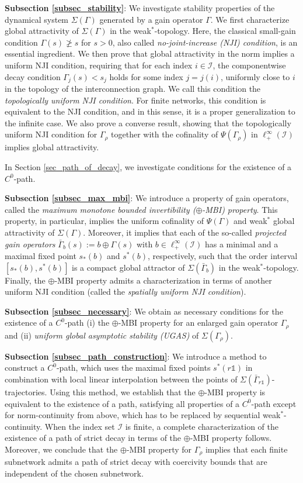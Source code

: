 \documentclass[10pt, oneside, a4paper]{article}
\newcommand{\unit}{\mathds{1}}
\newcommand{\IC}{\mathcal{I}}
\newcommand{\bsign}[1]{\bar{#1}}
\begin{document}
{\bf Subsection \ref{subsec_stability}}: We investigate stability properties of the dynamical system $\Sigma(\Gamma)$ generated by a gain operator $\Gamma$. We first characterize global attractivity of $\Sigma(\Gamma)$ in the weak$^*$-topology. Here, the classical small-gain condition $\Gamma(s) \not\geq s$ for $s > 0$, also called \emph{no-joint-increase (NJI) condition}, is an essential ingredient. We then prove that global attractivity in the norm implies a uniform NJI condition, requiring that for each index $i \in \IC$, the componentwise decay condition $\Gamma_j(s) < s_j$ holds for some index $j = j(i)$, uniformly close to $i$ in the topology of the interconnection graph. We call this condition the \emph{topologically uniform NJI condition}. For finite networks, this condition is equivalent to the NJI condition, and in this sense, it is a proper generalization to the infinite case. We also prove a converse result, showing that the topologically uniform NJI condition for $\Gamma_{\rho}$ together with the cofinality of $\Psi(\Gamma_{\rho})$ in $\ell^{\infty}_+(\IC)$ implies global attractivity.%

In Section \ref{sec_path_of_decay}, we investigate conditions for the existence of a $C^0$-path.%

{\bf Subsection \ref{subsec_max_mbi}}: We introduce a property of gain operators, called the \emph{maximum monotone bounded invertibility ($\oplus$-MBI) property}. This property, in particular, implies the uniform cofinality of $\Psi(\Gamma)$ and weak$^*$ global attractivity of $\Sigma(\Gamma)$. Moreover, it implies that each of the so-called \emph{projected gain operators} $\bsign{\Gamma}_b(s) := b \oplus \Gamma(s)$ with $b \in \ell^{\infty}_+(\IC)$ has a minimal and a maximal fixed point $s_*(b)$ and $s^*(b)$, respectively, such that the order interval $[s_*(b),s^*(b)]$ is a compact global attractor of $\Sigma(\bsign{\Gamma}_b)$ in the weak$^*$-topology. Finally, the $\oplus$-MBI property admits a characterization in terms of another uniform NJI condition (called the \emph{spatially uniform NJI condition}).%

{\bf Subsection \ref{subsec_necessary}}: We obtain as necessary conditions for the existence of a $C^0$-path (i) the $\oplus$-MBI property for an enlarged gain operator $\Gamma_{\rho}$ and (ii) \emph{uniform global asymptotic stability (UGAS)} of $\Sigma(\Gamma_{\rho})$.%

{\bf Subsection \ref{subsec_path_construction}}: We introduce a method to construct a $C^0$-path, which uses the maximal fixed points $s^*(r\unit)$ in combination with local linear interpolation between the points of $\Sigma(\bsign{\Gamma}_{r\unit})$-trajectories. Using this method, we establish that the $\oplus$-MBI property is equivalent to the existence of a path, satisfying all properties of a $C^0$-path except for norm-continuity from above, which has to be replaced by sequential weak$^*$-continuity. When the index set $\IC$ is finite, a complete characterization of the existence of a path of strict decay in terms of the $\oplus$-MBI property follows. Moreover, we conclude that the $\oplus$-MBI property for $\Gamma_{\rho}$ implies that each finite subnetwork admits a path of strict decay with coercivity bounds that are independent of the chosen subnetwork.%
\end{document}
